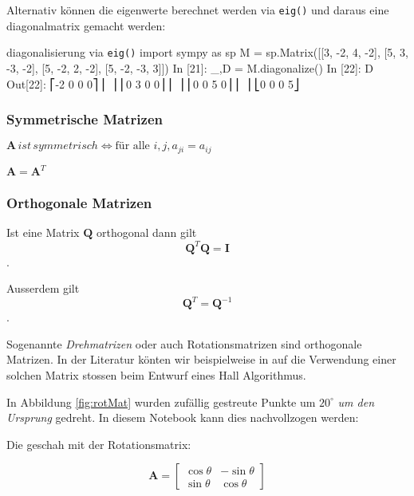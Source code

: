 Alternativ können die eigenwerte berechnet werden via \texttt{eig()} und daraus eine diagonalmatrix gemacht werden:
\begin{python}{diagonalisierung via \texttt{eig()}}
import sympy as sp  
M = sp.Matrix([[3, -2,  4, -2], 
               [5,  3, -3, -2], 
               [5, -2,  2, -2], 
               [5, -2, -3,  3]]) 
In [21]: _,D = M.diagonalize()
In [22]: D
Out[22]:
⎡-2  0  0  0⎤
⎢           ⎥
⎢0   3  0  0⎥
⎢           ⎥
⎢0   0  5  0⎥
⎢           ⎥
⎣0   0  0  5⎦
\end{python}


\subsubsection{Symmetrische Matrizen}
$\mathbf{A} \, ist \, symmetrisch \iff \text{für alle } i,j, a_{ji} = a_{ij}$

$\mathbf{A} = \mathbf{A}^T$



\subsubsection{Orthogonale Matrizen}

Ist eine Matrix $\mathbf{Q}$ orthogonal dann gilt 
$$ \mathbf{Q}^T\mathbf{Q} = \mathbf{I} $$.

Ausserdem gilt
$$ \mathbf{Q}^T = \mathbf{Q}^{-1} $$.


Sogenannte \emph{Drehmatrizen} oder auch Rotationsmatrizen sind orthogonale Matrizen. In der Literatur könten wir beispielweise in \citep{puckette2011infuriating} auf die Verwendung einer solchen Matrix stossen beim Entwurf eines Hall Algorithmus. 


In Abbildung \ref{fig:rotMat} wurden zufällig gestreute Punkte um $20^\circ$ \emph{um den Ursprung} gedreht. In diesem Notebook kann dies nachvollzogen werden: 

Die geschah mit der Rotationsmatrix:


\begin{equation}
    {\displaystyle \mathbf{A}={\begin{bmatrix}\cos \theta &-\sin \theta \\\sin \theta &\cos \theta \end{bmatrix}}}
\end{equation}

